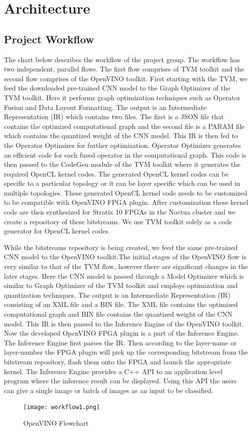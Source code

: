  \chapter{Architecture}
 \section{Project Workflow}
 The chart below describes the workflow of the project group. The workflow has two independent, parallel flows. The first flow comprises of TVM toolkit and the second flow comprises of the OpenVINO toolkit. First starting with the TVM, we feed the downloaded pre-trained CNN model to the Graph Optimizer of the TVM toolkit. Here it performs graph optimization techniques such as Operator Fusion and Data Layout Formatting. The output is an Intermediate Representation (IR) which contains two files. The first is a JSON file that contains the optimized computational graph and the second file is a PARAM file which contains the quantized weight of the CNN model. This IR is then fed to the Operator Optimizer for further optimization. Operator Optimizer generates an efficient code for each fused operator in the computational graph. This code is then passed to the CodeGen module of the TVM toolkit where it generates the required OpenCL kernel codes. The generated OpenCL kernel codes can be specific to a particular topology or it can be layer specific which can be used in multiple topologies. These generated OpenCL kernel code needs to be customized to be compatible with OpenVINO FPGA plugin. After customization these kernel code are then synthesized for Stratix 10 FPGAs in the Noctua cluster and we create a repository of these bitstreams. We use TVM toolkit solely as a code generator for OpenCL kernel codes.
 
 While the bitstreams repository is being created, we feed the same pre-trained CNN model to the OpenVINO toolkit.The initial stages of the OpenVINO flow is very similar to that of the TVM flow, however there are significant changes in the later stages. Here the CNN model is passed through a Model Optimizer which is similar to Graph Optimizer of the TVM toolkit and employs optimization and quantization techniques. The output is an Intermediate Representation (IR) consisting of an XML file and a BIN file. The XML file contains the optimized computational graph and BIN file contains the quantized weight of the CNN model. This IR is then passed to the Inference Engine of the OpenVINO toolkit. Now the developed OpenVINO FPGA plugin is a part of the Inference Engine. The Inference Engine first parses the IR. Then according to the layer-name or layer-number the FPGA plugin will pick up the corresponding bitstream from the bitstream repository, flash them onto the FPGA and launch the appropriate kernel. The Inference Engine provides a C++ API to an application level program where the inference result can be displayed. Using this API the users can give a single image or batch of images as an input to be classified.
 \begin{figure}[h!]
    \centering
    \texttt{[image: workflow1.png]}
    \caption{OpenVINO Flowchart}
\end{figure}

